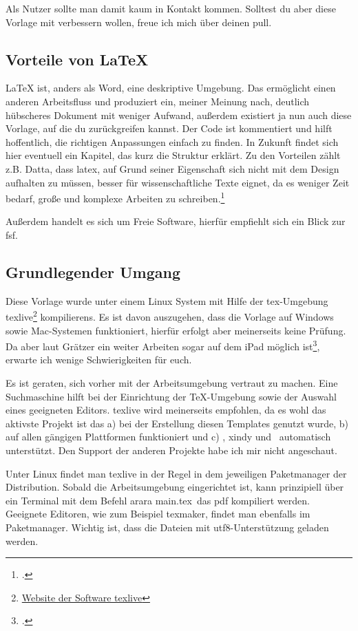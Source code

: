 Als Nutzer sollte man damit kaum in Kontakt kommen. Solltest du aber diese Vorlage mit verbessern wollen, freue ich mich über deinen \gls{pull}.
\subsection{Vorteile von \protect\LaTeX{}}%
\label{sec:vort-von}
\LaTeX{} ist, anders als Word, eine deskriptive Umgebung. Das ermöglicht einen anderen Arbeitsfluss und produziert ein, meiner Meinung nach, deutlich hübscheres Dokument mit weniger Aufwand, außerdem existiert ja nun auch diese Vorlage, auf die du zurückgreifen kannst. Der Code ist kommentiert und hilft hoffentlich, die richtigen Anpassungen einfach zu finden. In Zukunft findet sich hier eventuell ein Kapitel, das kurz die Struktur erklärt.
Zu den Vorteilen zählt z.B. Datta, dass \gls{latex}, auf Grund seiner Eigenschaft sich nicht mit dem Design aufhalten zu müssen, besser für wissenschaftliche Texte eignet, da es weniger Zeit bedarf, große und komplexe Arbeiten zu schreiben.\footcite[Vgl. ][S. 1f.]{datta_latex_2017}

Außerdem handelt es sich um Freie Software, hierfür empfiehlt sich ein Blick zur \gls{fsf}.
\subsection{Grundlegender Umgang}%
\label{sec:grundl}
Diese Vorlage wurde unter einem Linux System mit Hilfe der \gls{tex}-Umgebung texlive\footnote{\href{https://tug.org/texlive/}{Website der Software texlive}} \glspl{kompilieren}. Es ist davon auszugehen, dass die Vorlage auf Windows sowie Mac-Systemen funktioniert, hierfür erfolgt aber meinerseits keine Prüfung. Da aber laut Grätzer ein weiter Arbeiten sogar auf dem iPad möglich ist\footcite[Vgl. ][S. 179ff]{gratzer_practical_2014}, erwarte ich wenige Schwierigkeiten für euch.

Es ist geraten, sich vorher mit der Arbeitsumgebung vertraut zu machen. Eine Suchmaschine hilft bei der Einrichtung der TeX-Umgebung sowie der Auswahl eines geeigneten Editors. texlive wird meinerseits empfohlen, da es wohl das aktivste Projekt ist das a) bei der Erstellung diesen Templates genutzt wurde, b) auf allen gängigen Plattformen funktioniert und c) \protect{}, xindy und \protect{}\ automatisch unterstützt. Den Support der anderen Projekte habe ich mir nicht angeschaut.

Unter Linux findet man texlive in der Regel in dem jeweiligen Paketmanager der Distribution. Sobald die Arbeitsumgebung eingerichtet ist, kann prinzipiell über ein Terminal mit dem Befehl \glqq arara main.tex\grqq\ das pdf kompiliert werden.
Geeignete Editoren, wie zum Beispiel texmaker, findet man ebenfalls im Paketmanager. Wichtig ist, dass die Dateien mit \gls{utf8}-Unterstützung geladen werden.

